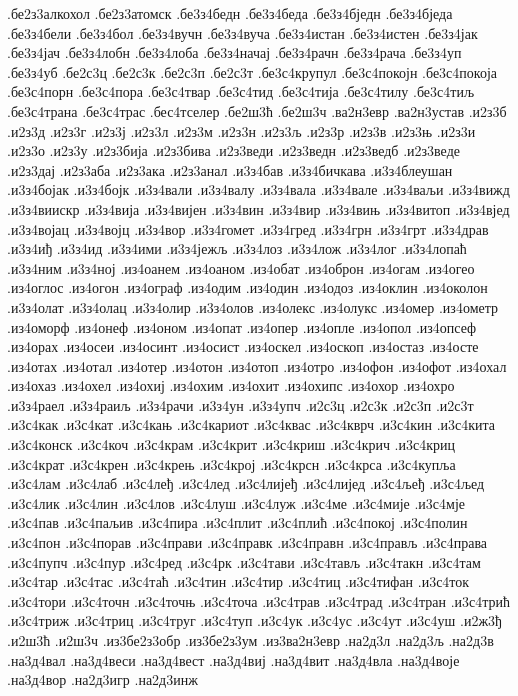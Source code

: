 {.бе2з3алкохол
.бе2з3атомск
.бе3з4бедн
.бе3з4беда
.бе3з4бједн
.бе3з4бједа
.бе3з4бели
.бе3з4бол
.бе3з4вучн
.бе3з4вуча
.бе3з4истан
.бе3з4истен
.бе3з4јак
.бе3з4јач
.бе3з4лобн
.бе3з4лоба
.бе3з4начај
.бе3з4рачн
.бе3з4рача
.бе3з4уп
.бе3з4уб
.бе2с3ц
.бе2с3к
.бе2с3п
.бе2с3т
.бе3с4крупул
.бе3с4покојн
.бе3с4покоја
.бе3с4порн
.бе3с4пора
.бе3с4твар
.бе3с4тид
.бе3с4тија
.бе3с4тилу
.бе3с4тиљ
.бе3с4трана
.бе3с4трас
.бес4тселер
.бе2ш3ћ
.бе2ш3ч
.ва2н3евр
.ва2н3устав
.и2з3б
.и2з3д
.и2з3г
.и2з3ј
.и2з3л
.и2з3м
.и2з3н
.и2з3љ
.и2з3р
.и2з3в
.и2з3њ
.и2з3и
.и2з3о
.и2з3у
.и2з3бија
.и2з3бива
.и2з3веди
.и2з3ведн
.и2з3ведб
.и2з3веде
.и2з3дај
.и2з3аба
.и2з3ака
.и2з3анал
.и3з4бав
.и3з4бичкава
.и3з4блеушан
.и3з4бојак
.и3з4бојк
.и3з4вали
.и3з4валу
.и3з4вала
.и3з4вале
.и3з4ваљи
.и3з4вижд
.и3з4виискр
.и3з4вија
.и3з4вијен
.и3з4вин
.и3з4вир
.и3з4вињ
.и3з4витоп
.и3з4вјед
.и3з4војац
.и3з4војц
.и3з4вор
.и3з4гомет
.и3з4гред
.и3з4грн
.и3з4грт
.и3з4драв
.и3з4иђ
.и3з4ид
.и3з4ими
.и3з4јежљ
.и3з4лоз
.и3з4лож
.и3з4лог
.и3з4лопаћ
.и3з4ним
.и3з4ној
.из4оанем
.из4оаном
.из4обат
.из4оброн
.из4огам
.из4огео
.из4оглос
.из4огон
.из4ограф
.из4одим
.из4один
.из4одоз
.из4оклин
.из4околон
.и3з4олат
.и3з4олац
.и3з4олир
.и3з4олов
.из4олекс
.из4олукс
.из4омер
.из4ометр
.из4оморф
.из4онеф
.из4оном
.из4опат
.из4опер
.из4опле
.из4опол
.из4опсеф
.из4орах
.из4осеи
.из4осинт
.из4осист
.из4оскел
.из4оскоп
.из4остаз
.из4осте
.из4отах
.из4отал
.из4отер
.из4отон
.из4отоп
.из4отро
.из4офон
.из4офот
.из4охал
.из4охаз
.из4охел
.из4охиј
.из4охим
.из4охит
.из4охипс
.из4охор
.из4охро
.и3з4раел
.и3з4раиљ
.и3з4рачи
.и3з4ун
.и3з4упч
.и2с3ц
.и2с3к
.и2с3п
.и2с3т
.и3с4как
.и3с4кат
.и3с4кањ
.и3с4кариот
.и3с4квас
.и3с4кврч
.и3с4кин
.и3с4кита
.и3с4конск
.и3с4коч
.и3с4крам
.и3с4крит
.и3с4криш
.и3с4крич
.и3с4криц
.и3с4крат
.и3с4крен
.и3с4крењ
.и3с4крој
.и3с4крсн
.и3с4крса
.и3с4купља
.и3с4лам
.и3с4лаб
.и3с4леђ
.и3с4лед
.и3с4лијеђ
.и3с4лијед
.и3с4љеђ
.и3с4љед
.и3с4лик
.и3с4лин
.и3с4лов
.и3с4луш
.и3с4луж
.и3с4ме
.и3с4мије
.и3с4мје
.и3с4пав
.и3с4паљив
.и3с4пира
.и3с4плит
.и3с4плић
.и3с4покој
.и3с4полин
.и3с4пон
.и3с4порав
.и3с4прави
.и3с4правк
.и3с4правн
.и3с4прављ
.и3с4права
.и3с4пупч
.и3с4пур
.и3с4ред
.и3с4рк
.и3с4тави
.и3с4тављ
.и3с4такн
.и3с4там
.и3с4тар
.и3с4тас
.и3с4таћ
.и3с4тин
.и3с4тир
.и3с4тиц
.и3с4тифан
.и3с4ток
.и3с4тори
.и3с4точн
.и3с4точњ
.и3с4точа
.и3с4трав
.и3с4трад
.и3с4тран
.и3с4трић
.и3с4триж
.и3с4триц
.и3с4труг
.и3с4туп
.и3с4ук
.и3с4ус
.и3с4ут
.и3с4уш
.и2ж3ђ
.и2ш3ћ
.и2ш3ч
.из3бе2з3обр
.из3бе2з3ум
.из3ва2н3евр
.на2д3л
.на2д3љ
.на2д3в
.на3д4вал
.на3д4веси
.на3д4вест
.на3д4виј
.на3д4вит
.на3д4вла
.на3д4воје
.на3д4вор
.на2д3игр
.на2д3инж
}
